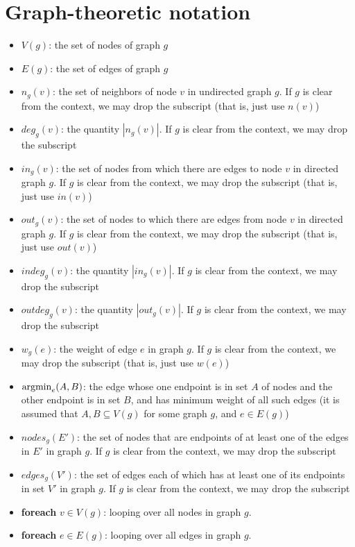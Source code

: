 \documentclass[10pt]{article}
\begin{document}
\section{Graph-theoretic notation}
\begin{itemize}
\item {\color{blue} $V(g)$}: the set of nodes of graph $g$
\item {\color{blue} $E(g)$}: the set of edges of graph $g$
\item {\color{blue} $n_g(v)$}: the set of neighbors of node $v$ in undirected graph $g$. If $g$ is clear from the context, we may drop the subscript (that is, just use $n(v)$)
\item {\color{blue} $deg_g(v)$}: the quantity $|n_g(v)|$. If $g$ is clear from the context, we may drop the subscript
\item {\color{blue} $in_g(v)$}: the set of nodes from which there are edges to node $v$ in directed graph $g$. If $g$ is clear from the context, we may drop the subscript (that is, just use $in(v)$)
\item {\color{blue} $out_g(v)$}: the set of nodes to which there are edges from node $v$ in directed graph $g$. If $g$ is clear from the context, we may drop the subscript (that is, just use $out(v)$)
\item {\color{blue} $indeg_g(v)$}: the quantity $|in_g(v)|$. If $g$ is clear from the context, we may drop the subscript
\item {\color{blue} $outdeg_g(v)$}: the quantity $|out_g(v)|$. If $g$ is clear from the context, we may drop the subscript
\item {\color{blue} $w_g(e)$}: the weight of edge $e$ in graph $g$. If $g$ is clear from the context, we may drop the subscript (that is, just use $w(e)$)
\item  {\color{blue} ${\rm argmin}_{e}(A,B)$}:
   the edge whose one endpoint is in set $A$ of nodes and the other endpoint is in set $B$, and has minimum weight of all such edges (it is assumed that $A,B \subseteq V(g)$ for some graph $g$, and $e \in E(g)$)
\item {\color{blue} $nodes_g(E')$}: the set of nodes that are endpoints of at least one of the edges in $E'$ in graph $g$. If $g$ is clear from the context, we may drop the subscript
\item {\color{blue} $edges_g(V')$}: the set of edges each of which has at least one of its endpoints in set $V'$ in graph $g$. If $g$ is clear from the context, we may drop the subscript
\item {\color{blue} {\bf foreach} $v \in V(g)$}: looping over all nodes in graph $g$. 
\item {\color{blue} {\bf foreach} $e \in E(g)$}: looping over all edges in graph $g$. 
\end{itemize}
\end{document}
